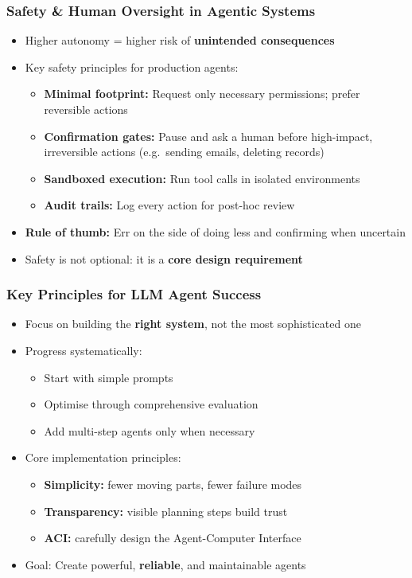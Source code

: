 \begin{frame}[fragile]\frametitle{Safety \& Human Oversight in Agentic Systems}
      \begin{itemize}
        \item Higher autonomy = higher risk of \textbf{unintended consequences}
        \item Key safety principles for production agents:
        \begin{itemize}
            \item \textbf{Minimal footprint:} Request only necessary permissions; prefer reversible actions
            \item \textbf{Confirmation gates:} Pause and ask a human before high-impact, irreversible actions (e.g.\ sending emails, deleting records)
            \item \textbf{Sandboxed execution:} Run tool calls in isolated environments
            \item \textbf{Audit trails:} Log every action for post-hoc review
        \end{itemize}
        \item \textbf{Rule of thumb:} Err on the side of doing less and confirming when uncertain
        \item Safety is not optional: it is a \textbf{core design requirement}
      \end{itemize}
\end{frame}

\begin{frame}[fragile]\frametitle{Key Principles for LLM Agent Success}
    \begin{itemize}
        \item Focus on building the \textbf{right system}, not the most sophisticated one
        \item Progress systematically:
            \begin{itemize}
                \item Start with simple prompts
                \item Optimise through comprehensive evaluation
                \item Add multi-step agents only when necessary
            \end{itemize}
        \item Core implementation principles:
            \begin{itemize}
                \item \textbf{Simplicity:} fewer moving parts, fewer failure modes
                \item \textbf{Transparency:} visible planning steps build trust
                \item \textbf{ACI:} carefully design the Agent-Computer Interface
            \end{itemize}
        \item Goal: Create powerful, \textbf{reliable}, and maintainable agents
    \end{itemize}
\end{frame}


